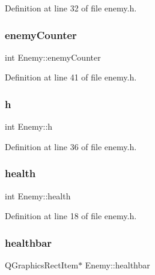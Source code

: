Definition at line 32 of file enemy.\+h.

\mbox{\label{class_enemy_a5e1ff7cda54fcc5ae02925b0ecdbe1bc}} 
\subsubsection{\texorpdfstring{enemy\+Counter}{enemyCounter}}
{\footnotesize\ttfamily int Enemy\+::enemy\+Counter\hspace{0.3cm}{\ttfamily [private]}}



Definition at line 41 of file enemy.\+h.

\mbox{\label{class_enemy_adcb5512e63e735485cbb83f763acce75}} 
\subsubsection{\texorpdfstring{h}{h}}
{\footnotesize\ttfamily int Enemy\+::h\hspace{0.3cm}{\ttfamily [private]}}



Definition at line 36 of file enemy.\+h.

\mbox{\label{class_enemy_aedd5e7bf8ef07ee97be433c853a10d8d}} 
\subsubsection{\texorpdfstring{health}{health}}
{\footnotesize\ttfamily int Enemy\+::health}



Definition at line 18 of file enemy.\+h.

\mbox{\label{class_enemy_ae2613608ff6c6d090a714874e722c340}} 
\subsubsection{\texorpdfstring{healthbar}{healthbar}}
{\footnotesize\ttfamily Q\+Graphics\+Rect\+Item$\ast$ Enemy\+::healthbar\hspace{0.3cm}{\ttfamily [private]}}



